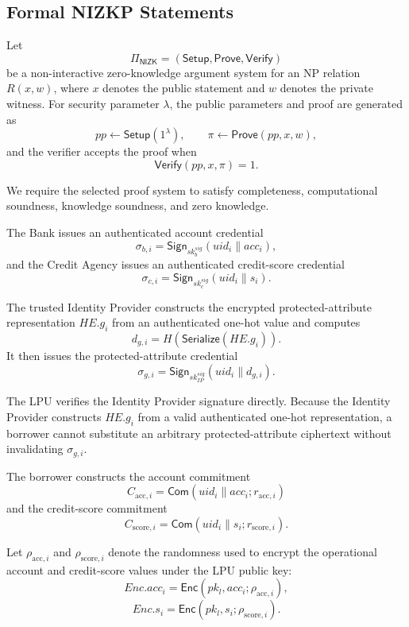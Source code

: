 \documentclass[a4paper,fleqn]{cas-dc}
\begin{document}
{\color{red}


\subsection{Formal NIZKP Statements}
\label{subsec:nizkp_formal}

Let
\[
\Pi_{\mathsf{NIZK}}
=
\left(
\mathsf{Setup},
\mathsf{Prove},
\mathsf{Verify}
\right)
\]
be a non-interactive zero-knowledge argument system for an NP relation
$R(x,w)$, where $x$ denotes the public statement and $w$ denotes the private
witness. For security parameter $\lambda$, the public parameters and proof are
generated as
\[
pp
\leftarrow
\mathsf{Setup}(1^\lambda),
\qquad
\pi
\leftarrow
\mathsf{Prove}(pp,x,w),
\]
and the verifier accepts the proof when
\[
\mathsf{Verify}(pp,x,\pi)=1.
\]

We require the selected proof system to satisfy completeness, computational
soundness, knowledge soundness, and zero knowledge.

The Bank issues an authenticated account credential
\[
\sigma_{b,i}
=
\mathsf{Sign}_{sk_b^{sig}}
\left(
uid_i \parallel acc_i
\right),
\]
and the Credit Agency issues an authenticated credit-score credential
\[
\sigma_{c,i}
=
\mathsf{Sign}_{sk_c^{sig}}
\left(
uid_i \parallel s_i
\right).
\]

The trusted Identity Provider constructs the encrypted protected-attribute
representation $HE.g_i$ from an authenticated one-hot value and computes
\[
d_{g,i}
=
H\left(
\mathsf{Serialize}(HE.g_i)
\right).
\]
It then issues the protected-attribute credential
\[
\sigma_{g,i}
=
\mathsf{Sign}_{sk_{IP}^{sig}}
\left(
uid_i \parallel d_{g,i}
\right).
\]

The LPU verifies the Identity Provider signature directly. Because the
Identity Provider constructs $HE.g_i$ from a valid authenticated one-hot
representation, a borrower cannot substitute an arbitrary protected-attribute
ciphertext without invalidating $\sigma_{g,i}$.

The borrower constructs the account commitment
\[
C_{\mathrm{acc},i}
=
\mathsf{Com}
\left(
uid_i \parallel acc_i;
r_{\mathrm{acc},i}
\right)
\]
and the credit-score commitment
\[
C_{\mathrm{score},i}
=
\mathsf{Com}
\left(
uid_i \parallel s_i;
r_{\mathrm{score},i}
\right).
\]

Let $\rho_{\mathrm{acc},i}$ and $\rho_{\mathrm{score},i}$ denote the
randomness used to encrypt the operational account and credit-score values
under the LPU public key:
\[
Enc.acc_i
=
\mathsf{Enc}
\left(
pk_l,
acc_i;
\rho_{\mathrm{acc},i}
\right),
\]
\[
Enc.s_i
=
\mathsf{Enc}
\left(
pk_l,
s_i;
\rho_{\mathrm{score},i}
\right).
\]

}
\end{document}
